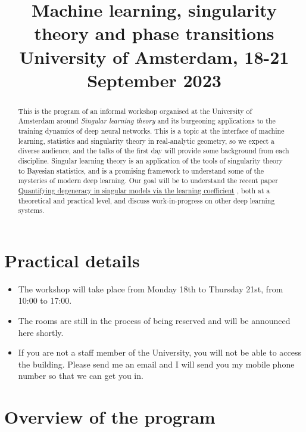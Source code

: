 \documentclass[a4paper,11pt]{amsart}
\title[Machine learning, singularity theory and phase transitions]{Machine learning, singularity theory and phase transitions \\ University of Amsterdam, 18-21 September 2023}
\begin{document}
\maketitle
\begin{abstract}
This is the program of an informal workshop organised at the University of Amsterdam around \emph{Singular learning theory} and its burgeoning applications to the training dynamics of deep neural networks. This is a topic at the interface of machine learning, statistics and singularity theory in real-analytic geometry, so we expect a diverse audience, and the talks of the first day will provide some background from each discipline. Singular learning theory is an application of the tools of singularity theory to Bayesian statistics, and is a promising framework to understand some of the mysteries of modern deep learning. Our goal will be to understand the recent paper \href{https://arxiv.org/abs/2308.12108}{Quantifying degeneracy in singular models via the learning coefficient} \cite{lambdahat}, both at a theoretical and practical level, and discuss work-in-progress on other deep learning systems.  
\end{abstract}

\section*{Practical details}

\begin{itemize}
\item The workshop will take place from Monday 18th to Thursday 21st, from 10:00 to 17:00.

\item The rooms are still in the process of being reserved and will be announced here shortly.

\item If you are not a staff member of the University, you will not be able to access the building. Please send me an email and I will send you my mobile phone number so that we can get you in.

\end{itemize}

\section*{Overview of the program}
\end{document}
